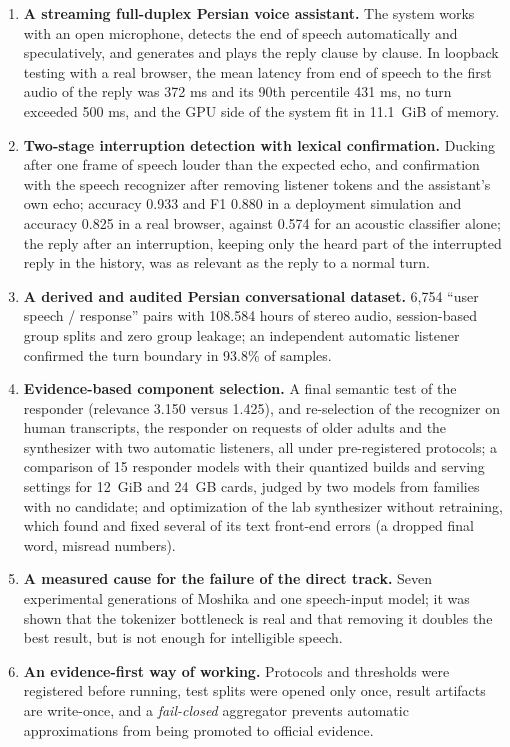 \begin{enumerate}
\item \textbf{A streaming full-duplex Persian voice assistant.} The system works
      with an open microphone, detects the end of speech automatically and
      speculatively, and generates and plays the reply clause by clause. In
      loopback testing with a real browser, the mean latency from end of speech to
      the first audio of the reply was 372 ms and its 90th percentile 431 ms, no
      turn exceeded 500 ms, and the GPU side of the system fit in 11.1~GiB of
      memory.

\item \textbf{Two-stage interruption detection with lexical confirmation.} Ducking
      after one frame of speech louder than the expected echo, and confirmation
      with the speech recognizer after removing listener tokens and the
      assistant's own echo; accuracy 0.933 and F1 0.880 in a deployment
      simulation and accuracy 0.825 in a real browser, against 0.574 for an
      acoustic classifier alone; the reply after an interruption, keeping only the
      heard part of the interrupted reply in the history, was as relevant as the
      reply to a normal turn.

\item \textbf{A derived and audited Persian conversational dataset.} 6,754 ``user
      speech / response'' pairs with 108.584 hours of stereo audio, session-based
      group splits and zero group leakage; an independent automatic listener
      confirmed the turn boundary in 93.8\% of samples.

\item \textbf{Evidence-based component selection.} A final semantic test of the
      responder (relevance 3.150 versus 1.425), and re-selection of the recognizer
      on human transcripts, the responder on requests of older adults and the
      synthesizer with two automatic listeners, all under pre-registered
      protocols; a comparison of 15 responder models with their quantized builds
      and serving settings for 12~GiB and 24~GB cards, judged by two models from
      families with no candidate; and optimization of the lab synthesizer without retraining, which
      found and fixed several of its text front-end errors (a dropped final word,
      misread numbers).

\item \textbf{A measured cause for the failure of the direct track.} Seven
      experimental generations of Moshika and one speech-input model; it was shown
      that the tokenizer bottleneck is real and that removing it doubles the best
      result, but is not enough for intelligible speech.

\item \textbf{An evidence-first way of working.} Protocols and thresholds were
      registered before running, test splits were opened only once, result
      artifacts are write-once, and a \emph{fail-closed} aggregator prevents
      automatic approximations from being promoted to official evidence.
\end{enumerate}

